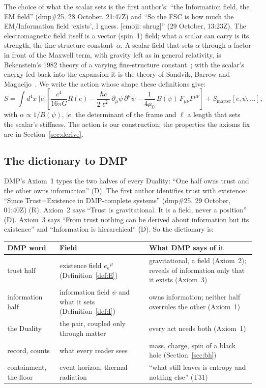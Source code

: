 \documentclass[11pt,a4paper]{article}
\theoremstyle{definition}
\theoremstyle{remark}
\newcommand{\tagD}{\textsf{(D)}}
\newcommand{\tagR}{\textsf{(R)}}
\begin{document}
\noindent The choice of what the scalar sets is the first author's: ``the Information field, the EM field'' (dmp\#25, 28 October,
21:47Z) and ``So the FSC is how much the EM/Information field `exists', I guess. [emoji: shrug]'' (29 October, 13:23Z). The
electromagnetic field itself is a vector (spin~1) field; what a scalar can carry is its strength, the fine-structure constant~$\alpha$.
A scalar field that sets $\alpha$ through a factor in front of the Maxwell term, with gravity left as in general relativity, is
Bekenstein's 1982 theory of a varying fine-structure constant~\cite{bekenstein82}; with the scalar's energy fed back into the expansion it
is the theory of Sandvik, Barrow and Magueijo~\cite{bsbm}. We write the action whose shape these definitions give:
\begin{equation}\label{eq:action}
S=\int d^4x\;|e|\left[\frac{c^4}{16\pi G}R(e)-\frac{\hbar c}{2\ell^2}\,\partial_\mu\psi\,\partial^\mu\psi
-\frac{1}{4\mu_0}\,B(\psi)\,F_{\mu\nu}F^{\mu\nu}\right]+S_{\text{matter}}[e,\psi,\dots],
\end{equation}
with $\alpha\propto 1/B(\psi)$, $|e|$ the determinant of the frame and $\ell$ a length that sets the scalar's stiffness. The action is our construction; the
properties the axioms fix are in Section~\ref{sec:derive}.

\subsection{The dictionary to DMP}

DMP's Axiom~1 types the two halves of every Duality: ``One half owns trust and the other owns information'' \tagD. The first author
identifies trust with existence: ``Since Trust=Existence in DMP-complete systems'' (dmp\#25, 29 October, 01:40Z) \tagR. Axiom~2 says
``Trust is gravitational. It is a field, never a position'' \tagD. Axiom~3 says ``From trust nothing can be derived about information
but its existence'' and ``Information is hierarchical'' \tagD. So the dictionary is:

\begin{center}\small
\begin{tabularx}{\linewidth}{@{}lLL@{}}
\toprule
DMP word & Field & What DMP says of it \\
\midrule
trust half & existence field $e_a{}^\mu$ (Definition~\ref{def:E}) & gravitational, a field (Axiom~2); reveals of information only that it exists (Axiom~3) \\
information half & information field $\psi$ and what it sets (Definition~\ref{def:I}) & owns information; neither half overrules the other (Axiom~1) \\
the Duality & the pair, coupled only through matter & every act needs both (Axiom~1) \\
record, counts & what every reader sees & mass, charge, spin of a black hole (Section~\ref{sec:bh}) \\
containment, the floor & event horizon, thermal radiation & ``what still leaves is entropy and nothing else'' (T31) \\
\bottomrule
\end{tabularx}
\end{center}
\end{document}
